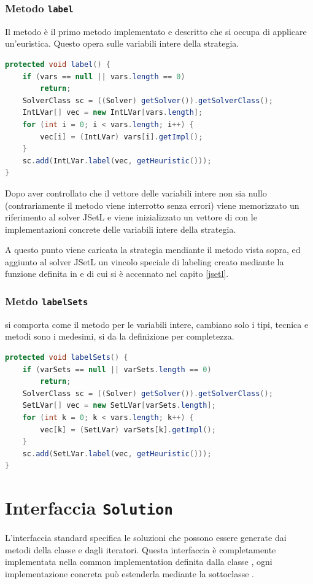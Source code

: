\subsubsection{Metodo \texttt{label}}
Il metodo  è il primo metodo implementato e descritto che si
occupa di applicare un'euristica. Questo opera sulle variabili intere della 
strategia.
\begin{lstlisting}[language = Java,
                   caption = {\files{label()}.}]
protected void label() {
	if (vars == null || vars.length == 0)
		return;
	SolverClass sc = ((Solver) getSolver()).getSolverClass();
	IntLVar[] vec = new IntLVar[vars.length];
	for (int i = 0; i < vars.length; i++) {
		vec[i] = (IntLVar) vars[i].getImpl();
	}
	sc.add(IntLVar.label(vec, getHeuristic()));
}
\end{lstlisting}
Dopo aver controllato che il vettore delle variabili intere non sia nullo
(contrariamente il metodo viene interrotto senza errori) viene memorizzato
un riferimento al solver JSetL e viene inizializzato un vettore di
 con le implementazioni concrete delle variabili intere
della strategia.

A questo punto viene caricata la strategia mendiante il metodo
 vista sopra, ed aggiunto al solver JSetL un vincolo
speciale di labeling creato mediante la funzione
 definita in \cite{tesiAmadini} e di 
cui si
è accennato nel capito \ref{jsetl}.

\subsubsection{Metdo \texttt{labelSets}}
 si comporta come il metodo per le variabili intere, cambiano
solo i tipi, tecnica e metodi sono i medesimi, si da la definizione per 
completezza.
\begin{lstlisting}[language = Java,
                   caption = {\files{labelSets()}.}]
protected void labelSets() {
	if (varSets == null || varSets.length == 0)
		return;
	SolverClass sc = ((Solver) getSolver()).getSolverClass();
	SetLVar[] vec = new SetLVar[varSets.length];
	for (int k = 0; k < vars.length; k++) {
		vec[k] = (SetLVar) varSets[k].getImpl();
	}
	sc.add(SetLVar.label(vec, getHeuristic()));
}
\end{lstlisting}

\section{Interfaccia \texttt{Solution}}
L'interfaccia standard  specifica le soluzioni che possono
essere generate dai metodi della classe  e dagli iteratori.
Questa interfaccia è completamente implementata nella common implementation
definita dalla classe ,
ogni implementazione concreta può estenderla mediante la sottoclasse
.

